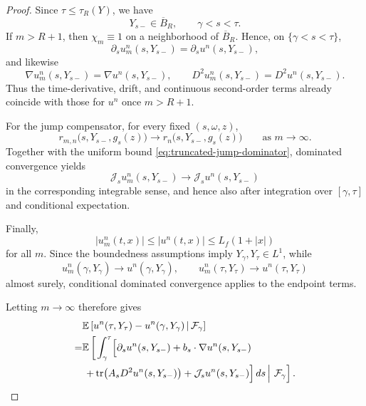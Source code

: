 \documentclass[10pt,a4paper]{amsart}
\begin{document}
\begin{proof}
Since \(\tau\leq\tau_R(Y)\), we have
\[
Y_{s-}\in\overline B_R,
\qquad
\gamma<s<\tau.
\]
If \(m>R+1\), then \(\chi_m\equiv1\) on a neighborhood of
\(\overline B_R\). Hence, on \(\{\gamma<s<\tau\}\),
\[
\partial_su_m^n(s,Y_{s-})
=
\partial_su^n(s,Y_{s-}),
\]
and likewise
\[
\nabla u_m^n(s,Y_{s-})
=
\nabla u^n(s,Y_{s-}),
\qquad
D^2u_m^n(s,Y_{s-})
=
D^2u^n(s,Y_{s-}).
\]
Thus the time-derivative, drift, and continuous second-order terms
already coincide with those for \(u^n\) once \(m>R+1\).

For the jump compensator, for every fixed \((s,\omega,z)\),
\[
r_{m,n}\bigl(s,Y_{s-},g_s(z)\bigr)
\longrightarrow
r_n\bigl(s,Y_{s-},g_s(z)\bigr)
\qquad\text{as }m\to\infty.
\]
Together with the uniform bound
\eqref{eq:truncated-jump-dominator}, dominated convergence yields
\[
\mathcal J_su_m^n(s,Y_{s-})
\longrightarrow
\mathcal J_su^n(s,Y_{s-})
\]
in the corresponding integrable sense, and hence also after integration
over \([\gamma,\tau]\) and conditional expectation.

Finally,
\[
|u_m^n(t,x)|
\leq
|u^n(t,x)|
\leq
L_f(1+|x|)
\]
for all \(m\). Since the boundedness assumptions imply
\(Y_\gamma,Y_\tau\in L^1\), while
\[
u_m^n(\gamma,Y_\gamma)\to u^n(\gamma,Y_\gamma),
\qquad
u_m^n(\tau,Y_\tau)\to u^n(\tau,Y_\tau)
\]
almost surely, conditional dominated convergence applies to the endpoint
terms.

Letting \(m\to\infty\) therefore gives
\begin{equation}
	\label{eq:ito-formula-krylov-revised}
	\begin{aligned}
		&\mathbb E\left[
		u^n(\tau,Y_\tau)
		-u^n(\gamma,Y_\gamma)
		\,\middle|\,
		\mathcal F_\gamma
		\right]
		\\
		=&
		\mathbb E\left[
		\left.
		\int_\gamma^\tau
		\Bigl[
		\partial_su^n(s,Y_{s-})
		+b_s\cdot\nabla u^n(s,Y_{s-})
		\right.\right.
		\\
		&\left.\left.
		+\operatorname{tr}\!\left(
		A_sD^2u^n(s,Y_{s-})
		\right)
		+\mathcal J_su^n(s,Y_{s-})
		\Bigr]\,ds
		\,\right|\,
		\mathcal F_\gamma
		\right].
	\end{aligned}
\end{equation}


\end{proof}
\end{document}
